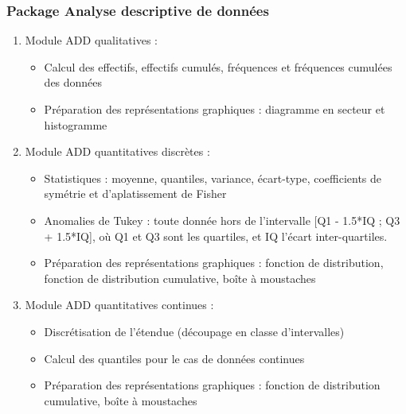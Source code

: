 			\subsubsection*{Package Analyse descriptive de données}
			\begin{enumerate}[leftmargin=*]
				\item Module ADD qualitatives :
					\begin{itemize}[leftmargin=0.2cm]
					\item Calcul des effectifs, effectifs cumulés, fréquences et fréquences cumulées des données
					\item Préparation des représentations graphiques : diagramme en secteur et histogramme
					\end{itemize}
				\item Module ADD quantitatives discrètes :
					\begin{itemize}[leftmargin=0.2cm]
					\item Statistiques : moyenne, quantiles, variance, écart-type, coefficients de symétrie et d'aplatissement de Fisher
					\item Anomalies de Tukey : toute donnée hors de l'intervalle [Q1 - 1.5*IQ ; Q3 + 1.5*IQ], où Q1 et Q3 sont les quartiles, et IQ l'écart inter-quartiles.
					\item Préparation des représentations graphiques : fonction de distribution, fonction de distribution cumulative, boîte à moustaches
					\end{itemize}
				\item Module ADD quantitatives continues :
					\begin{itemize}[leftmargin=0.2cm]
					\item Discrétisation de l'étendue (découpage en classe d'intervalles)
					\item Calcul des quantiles pour le cas  de données continues
					\item Préparation des représentations graphiques : fonction de distribution cumulative, boîte à moustaches
					\end{itemize}
			\end{enumerate}
			
